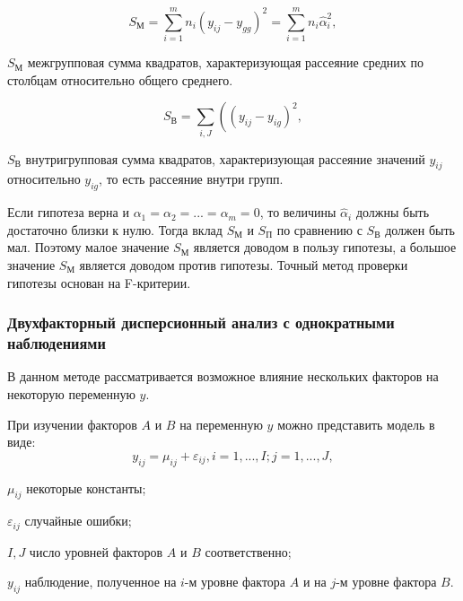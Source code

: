 \begin{equation}
\label{eq:sp}
S_М=\sum_{i=1}^{m}{n_i\left(y_{ij}-y_{gg}\right)^2=\sum_{i=1}^{m}{n_i\widehat{\alpha}_i^2}},
\end{equation}
\begin{eqexpl}[15mm]
\item{$S_М$} межгрупповая сумма квадратов, характеризующая рассеяние средних по столбцам относительно общего среднего.
\end{eqexpl}

\begin{equation}
\label{eq:sv}
S_В=\sum_{i,J}{\left(\left(y_{ij}-y_{ig}\right)^2},
\end{equation}
\begin{eqexpl}[15mm]
\item{$S_В$} внутригрупповая сумма квадратов, характеризующая рассеяние значений $y_{ij}$ относительно $y_{ig}$, то есть рассеяние внутри групп.
\end{eqexpl}

Если гипотеза верна и $\alpha_1=\alpha_2=...=\alpha_m=0$, то величины $\widehat{\alpha}_i$ должны быть достаточно близки к нулю. Тогда вклад $S_М$ и $S_П$ по сравнению с $S_В$ должен быть мал. Поэтому малое значение $S_М$ является доводом в пользу гипотезы, а большое значение $S_М$ является доводом против гипотезы. Точный метод проверки гипотезы основан на F-критерии. \cite{disperMethod}

\subsubsection{Двухфакторный дисперсионный анализ с однократными наблюдениями}

В данном методе рассматривается возможное влияние нескольких факторов на некоторую переменную $y$.

При изучении факторов $A$ и $B$ на переменную $y$ можно представить модель в виде:
\begin{equation}
\label{eq:modelTwoFactors}
y_{ij}=\mu_{ij}+\varepsilon_{ij},i=1,...,I;j=1,...,J,
\end{equation}
\begin{eqexpl}[15mm]
\item{$\mu_{ij}$} некоторые константы;
\item{$\varepsilon_{ij}$} случайные ошибки;
\item{$I,J$} число уровней факторов $A$ и $B$ соответственно;
\item{$y_{ij}$} наблюдение, полученное на $i$-м уровне фактора $A$ и на $j$-м уровне фактора $B$.
\end{eqexpl}

